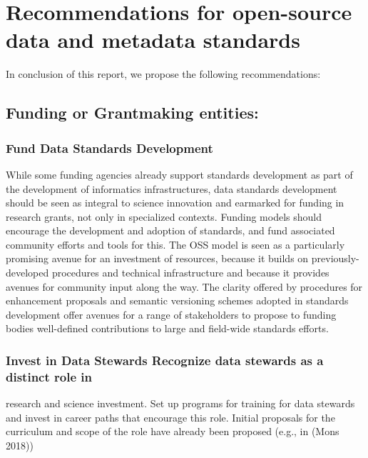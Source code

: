 \documentclass[
  letterpaper,
  DIV=11,
  numbers=noendperiod]{scrartcl}
\begin{document}
\section{Recommendations for open-source data and metadata
standards}\label{recommendations-for-open-source-data-and-metadata-standards}

In conclusion of this report, we propose the following recommendations:

\subsection{Funding or Grantmaking
entities:}\label{funding-or-grantmaking-entities}

\subsubsection{Fund Data Standards
Development}\label{fund-data-standards-development}

While some funding agencies already support standards development as
part of the development of informatics infrastructures, data standards
development should be seen as integral to science innovation and
earmarked for funding in research grants, not only in specialized
contexts. Funding models should encourage the development and adoption
of standards, and fund associated community efforts and tools for this.
The OSS model is seen as a particularly promising avenue for an
investment of resources, because it builds on previously-developed
procedures and technical infrastructure and because it provides avenues
for community input along the way. The clarity offered by procedures for
enhancement proposals and semantic versioning schemes adopted in
standards development offer avenues for a range of stakeholders to
propose to funding bodies well-defined contributions to large and
field-wide standards efforts.

\subsubsection{Invest in Data Stewards Recognize data stewards as a
distinct role
in}\label{invest-in-data-stewards-recognize-data-stewards-as-a-distinct-role-in}

research and science investment. Set up programs for training for data
stewards and invest in career paths that encourage this role. Initial
proposals for the curriculum and scope of the role have already been
proposed (e.g., in (Mons 2018))
\end{document}
